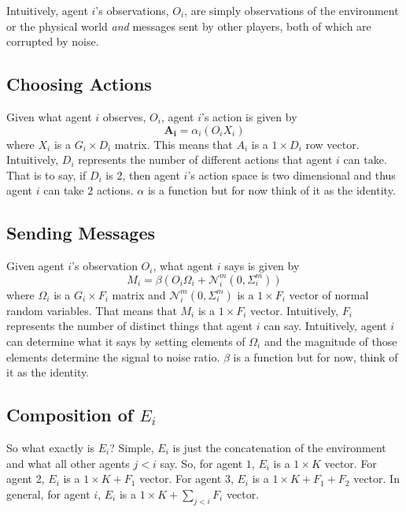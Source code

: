 \documentclass{article}
\begin{document}
Intuitively, agent $i$'s observations, $O_i$, are simply observations
of the environment or the physical world \emph{and} messages sent by
other players, both of which are corrupted by noise.  


\subsection{Choosing Actions}


Given what agent $i$ observes, $O_i$, agent $i$'s action is given by
\begin{equation}
  \mathbf{A_{i}} = \alpha_i(O_iX_i)
\end{equation}
where $X_i$ is a $G_i\times D_i$ matrix.  This means that $A_i$ is a
$1\times D_i$ row vector.  Intuitively, $D_i$ represents the number of
different actions that agent $i$ can take.  That is to say, if $D_i$
is 2, then agent $i$'s action space is two dimensional and thus agent
$i$ can take $2$ actions.  $\alpha$ is a function but for now think of
it as the identity.  

\subsection{Sending Messages}
Given agent $i$'s observation $O_i$, what agent $i$ says is given by
\begin{equation}
M_i = \beta(O_i\Omega_i + \mathcal{N}^m_{i}(0, \Sigma^m_{i}))
\end{equation}
where $\Omega_i$ is a $G_i\times F_i$ matrix and $\mathcal{N}^m_{i}(0,
\Sigma^m_{i})$ is a $1\times F_i$ vector of normal random
variables.  That means that $M_i$ is a $1\times F_i$ vector.
Intuitively, $F_i$ represents the number of distinct things that agent
$i$ can say.  Intuitively, agent $i$ can determine what it says by
setting elements of $\Omega_i$ and the magnitude of those elements
determine the signal to noise ratio.  $\beta$ is a function but for
now, think of it as the identity.

\subsection{Composition of $E_i$}
So what exactly is $E_i$?  Simple, $E_i$ is just the concatenation of
the environment and what all other agents $j<i$ say.  So, for agent
$1$, $E_i$ is a $1\times K$ vector.  For agent 2, $E_i$ is a $1\times
K + F_1$ vector.  For agent $3$, $E_i$ is a $1\times K + F_1 +F_2$ 
vector.  In general, for agent $i$, $E_i$ is a $1\times K +
\sum_{j<i}F_i$ vector.
\end{document}
